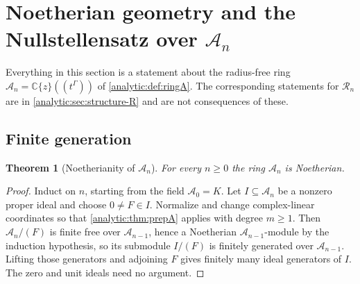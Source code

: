 \documentclass[11pt,letterpaper]{article}
\newtheorem{theorem}{Theorem}[section]
\theoremstyle{definition}
\theoremstyle{remark}
\newcommand{\C}{\mathbb C}
\newcommand{\A}{\mathscr A}
\newcommand{\RR}{\mathscr R}
\numberwithin{equation}{section}
\begin{document}
\section{Noetherian geometry and the Nullstellensatz over $\A_n$}
\label{analytic:sec:structure-A}

Everything in this section is a statement about the radius-free ring
$\A_n=\C\{z\}((t^\Gamma))$ of \cref{analytic:def:ringA}. The corresponding
statements for $\RR_n$ are in \cref{analytic:sec:structure-R} and are not
consequences of these.

\subsection{Finite generation}
\begin{theorem}[Noetherianity of $\A_n$]\label{analytic:thm:noetherianA}
For every $n\ge0$ the ring $\A_n$ is Noetherian.
\end{theorem}
\begin{proof}
Induct on $n$, starting from the field $\A_0=K$. Let $I\subseteq\A_n$ be a
nonzero proper ideal and choose $0\ne F\in I$. Normalize and change
complex-linear coordinates so that \cref{analytic:thm:prepA} applies with
degree $m\ge1$. Then $\A_n/(F)$ is finite free over $\A_{n-1}$, hence a
Noetherian $\A_{n-1}$-module by the induction hypothesis, so its submodule
$I/(F)$ is finitely generated over $\A_{n-1}$. Lifting those generators and
adjoining $F$ gives finitely many ideal generators of $I$. The zero and unit
ideals need no argument.
\end{proof}
\end{document}
